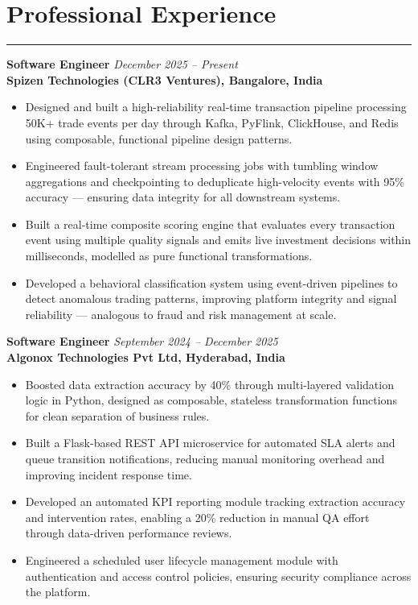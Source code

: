\documentclass[10pt]{article}
\begin{document}
\section*{Professional Experience}
\vspace{1pt}\hrule\vspace{4pt}

\textbf{Software Engineer} \hfill \textit{December 2025 -- Present} \\
\textbf{Spizen Technologies (CLR3 Ventures), Bangalore, India}
\begin{itemize}
  \item Designed and built a high-reliability real-time transaction pipeline processing 50K+ trade events per day through Kafka, PyFlink, ClickHouse, and Redis using composable, functional pipeline design patterns.
  \item Engineered fault-tolerant stream processing jobs with tumbling window aggregations and checkpointing to deduplicate high-velocity events with 95\% accuracy — ensuring data integrity for all downstream systems.
  \item Built a real-time composite scoring engine that evaluates every transaction event using multiple quality signals and emits live investment decisions within milliseconds, modelled as pure functional transformations.
  \item Developed a behavioral classification system using event-driven pipelines to detect anomalous trading patterns, improving platform integrity and signal reliability — analogous to fraud and risk management at scale.
\end{itemize}

\textbf{Software Engineer} \hfill \textit{September 2024 -- December 2025} \\
\textbf{Algonox Technologies Pvt Ltd, Hyderabad, India}
\begin{itemize}
  \item Boosted data extraction accuracy by 40\% through multi-layered validation logic in Python, designed as composable, stateless transformation functions for clean separation of business rules.
  \item Built a Flask-based REST API microservice for automated SLA alerts and queue transition notifications, reducing manual monitoring overhead and improving incident response time.
  \item Developed an automated KPI reporting module tracking extraction accuracy and intervention rates, enabling a 20\% reduction in manual QA effort through data-driven performance reviews.
  \item Engineered a scheduled user lifecycle management module with authentication and access control policies, ensuring security compliance across the platform.
\end{itemize}
\end{document}
